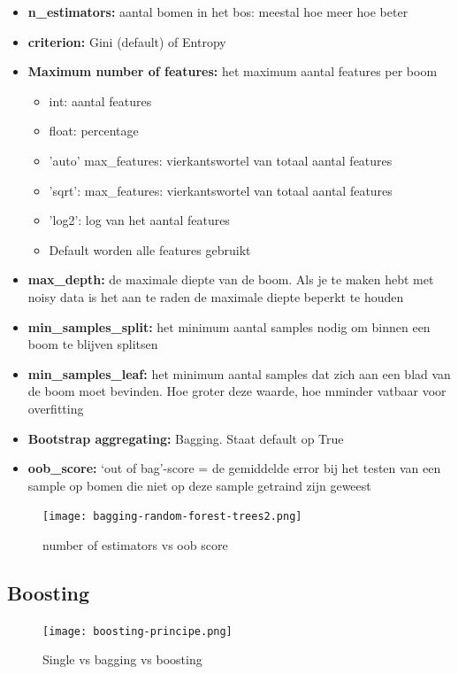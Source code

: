 \documentclass{article}
\begin{document}
\begin{itemize}
    \item \textbf{n\_estimators:} aantal bomen in het bos: meestal hoe meer hoe beter
    \item \textbf{criterion: } Gini (default) of Entropy
    \item \textbf{Maximum number of features:} het maximum aantal features per boom
    \begin{itemize}
        \item int: aantal features
        \item float: percentage
        \item 'auto' max\_features: vierkantswortel van totaal aantal features
        \item 'sqrt': max\_features: vierkantswortel van totaal aantal features
        \item 'log2': log van het aantal features
        \item Default worden alle features gebruikt
    \end{itemize}
    \item \textbf{max\_depth:} de maximale diepte van de boom. Als je te maken hebt met noisy data is het aan te raden de maximale diepte beperkt te houden
    \item \textbf{min\_samples\_split:} het minimum aantal samples nodig om binnen een boom te blijven splitsen
    \item \textbf{min\_samples\_leaf:} het minimum aantal samples dat zich aan een blad van de boom moet bevinden. Hoe groter deze waarde, hoe mminder vatbaar voor overfitting
    \item \textbf{Bootstrap aggregating: } Bagging. Staat default op True
    \item \textbf{oob\_score:} `out of bag'-score = de gemiddelde error bij het testen van een sample op bomen die niet op deze sample getraind zijn geweest
\end{itemize}

\begin{figure}[H]
    \centering
    \texttt{[image: bagging-random-forest-trees2.png]}
    \caption{number of estimators vs oob score}
\end{figure}


\subsection{Boosting}

\begin{figure}[H]
    \centering
    \texttt{[image: boosting-principe.png]}
    \caption{Single vs bagging vs boosting}
\end{figure}
\end{document}
